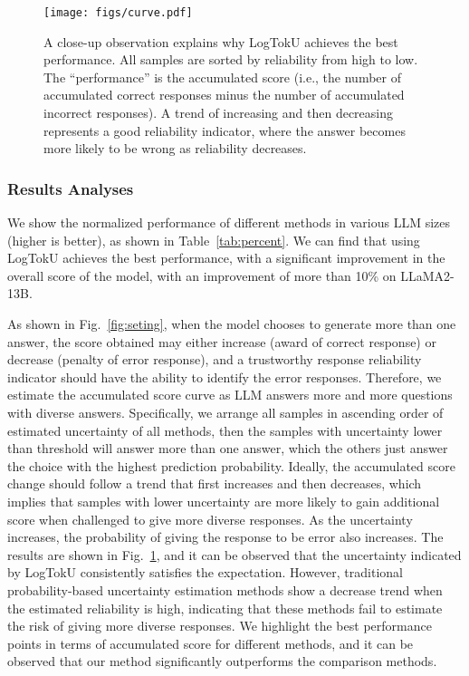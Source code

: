 \begin{figure}
\centering
\texttt{[image: figs/curve.pdf]}
\caption{A close-up observation explains why LogTokU achieves the best performance. All samples are sorted by reliability from high to low. The ``performance'' is the accumulated score (i.e., the number of accumulated correct responses minus the number of accumulated incorrect responses). A trend of increasing and then decreasing represents a good reliability indicator, where the answer becomes more likely to be wrong as reliability decreases.}
\label{fig:curve}
\end{figure}


\subsubsection{Results Analyses}

We show the normalized performance of different methods in various LLM sizes (higher is better), as shown in Table~\ref{tab:percent}. We can find that using LogTokU achieves the best performance, with a significant improvement in the overall score of the model, with an improvement of more than 10\% on LLaMA2-13B. 



As shown in Fig.~\ref{fig:seting}, when the model chooses to generate more than one answer, the score obtained may either increase (award of correct response) or decrease (penalty of error response), and a trustworthy response reliability indicator should have the ability to identify the error responses. Therefore, we estimate the accumulated score curve as LLM answers more and more questions with diverse answers. Specifically, we arrange all samples in ascending order of estimated uncertainty of all methods, then the samples with uncertainty lower than threshold will answer more than one answer, which the others just answer the choice with the highest prediction probability.
Ideally, the accumulated score change should follow a trend that first increases and then decreases, which implies that samples with lower uncertainty are more likely to gain additional score when challenged to give more diverse responses. As the uncertainty increases, the probability of giving the response to be error also increases. The results are shown in Fig.~\ref{fig:curve}, and it can be observed that the uncertainty indicated by LogTokU consistently satisfies the expectation. However, traditional probability-based uncertainty estimation methods show a decrease trend when the estimated reliability is high, indicating that these methods fail to estimate the risk of giving more diverse responses. We highlight the best performance points in terms of accumulated score for different methods, and it can be observed that our method significantly outperforms the comparison methods.


